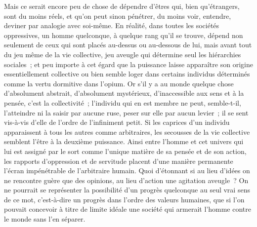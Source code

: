 \documentclass[french,twoside]{book} %
\begin{document}
Mais ce serait encore peu de chose de dépendre d'êtres qui, bien qu'étrangers, sont du moins réels, et qu'on peut sinon pénétrer, du moins voir, entendre, deviner par analogie avec soi-même. En réalité, dans toutes les sociétés oppressives, un homme quelconque, à quelque rang qu'il se trouve, dépend non seulement de ceux qui sont placés au-dessus ou au-dessous de lui, mais avant tout du jeu même de la vie collective, jeu aveugle qui détermine seul les hiérarchies sociales ; et peu importe à cet égard que la puissance laisse apparaître son origine essentiellement collective ou bien semble loger dans certains individus déterminés comme la vertu dormitive dans l'opium. Or s'il y a au monde quelque chose d'absolument abstrait, d'absolument mystérieux, d'inaccessible aux sens et à la pensée, c'est la collectivité ; l'individu qui en est membre ne peut, semble-t-il, l'atteindre ni la saisir par aucune ruse, peser sur elle par aucun levier ; il se sent vis-à-vis d'elle de l'ordre de l'infiniment petit. Si les caprices d'un individu apparaissent à tous les autres comme arbitraires, les secousses de la vie collective semblent l'être à la deuxième puissance. Ainsi entre l'homme et cet univers qui lui est assigné par le sort comme l'unique matière de sa pensée et de son action, les rapports d'oppression et de servitude placent d'une manière permanente l'écran impénétrable de l'arbitraire humain. Quoi d'étonnant si au lieu d'idées on ne rencontre guère que des opinions, au lieu d'action une agitation aveugle ? On ne pourrait se représenter la possibilité d'un progrès quelconque au seul vrai sens de ce mot, c'est-à-dire un progrès dans l'ordre des valeurs humaines, que si l'on pouvait concevoir à titre de limite idéale une société qui armerait l'homme contre le monde sans l'en séparer.\par
\end{document}
